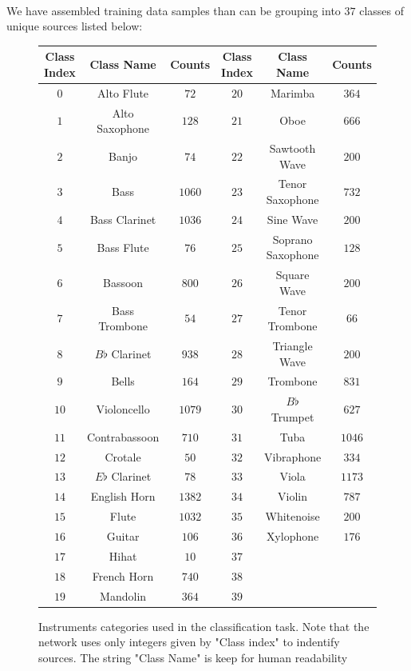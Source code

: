 \documentclass[12pt,letterpaper]{article}
\begin{document}
\paragraph*{}We have assembled training data samples than can be grouping into $37$ classes of unique sources listed below:

\begin{figure}[H]
\begin{center}
\begin{tabular}{||c|c|c| |c|c|c||}
\hline
\textbf{Class Index} & \textbf{Class Name} & \textbf{Counts} & \textbf{Class Index} & \textbf{Class Name} & \textbf{Counts} \\
\hline \hline
$0$ & Alto Flute & $72$ 			& $20$ & Marimba & $364$ \\ \hline
$1$ & Alto Saxophone & $128$ 		& $21$ & Oboe & $666$  \\ \hline
$2$ & Banjo & $74$ 					& $22$ & Sawtooth Wave & $200$ \\ \hline
$3$ & Bass & $1060$ 				& $23$ & Tenor Saxophone & $732$ \\ \hline
$4$ & Bass Clarinet & $1036$ 		& $24$ & Sine Wave & $200$ \\ \hline

$5$ & Bass Flute & $76$ 			& $25$ & Soprano Saxophone & $128$\\ \hline
$6$ & Bassoon & $800$ 				& $26$ & Square Wave & $200$ \\ \hline
$7$ & Bass Trombone & $54$ 			& $27$ & Tenor Trombone & $66$ \\ \hline
$8$ & $B\flat$ Clarinet & $938$ 	& $28$ & Triangle Wave & $200$ \\ \hline
$9$ & Bells & $164$ 				& $29$ & Trombone & $831$ \\ \hline

$10$ & Violoncello & $1079$ 		& $30$ & $B\flat$ Trumpet & $627$ \\ \hline
$11$ & Contrabassoon & $710$ 		& $31$ & Tuba & $1046$ \\ \hline
$12$ & Crotale & $50$ 				& $32$ & Vibraphone & $334$ \\ \hline
$13$ & $E\flat$ Clarinet & $78$ 	& $33$ & Viola & $1173$ \\ \hline
$14$ & English Horn & $1382$ 		& $34$ & Violin & $787$ \\ \hline

$15$ & Flute & $1032$ 				& $35$ & Whitenoise & $200$ \\ \hline
$16$ & Guitar & $106$ 				& $36$ & Xylophone & $176$ \\ \hline
$17$ & Hihat & $10$ 				& $37$ & & \\ \hline
$18$ & French Horn & $740$ 			& $38$ & & \\ \hline
$19$ & Mandolin & $364$ 			& $39$ & & \\ \hline

\end{tabular}
\end{center}
\caption{Instruments categories used in the classification task. Note that the network uses only integers given by "Class index" to indentify sources. The string "Class Name" is keep for human readability}
\label{fig-ClassList}
\end{figure}
\end{document}
